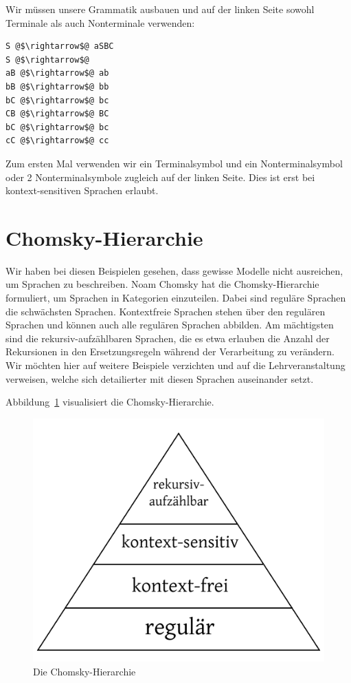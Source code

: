 Wir müssen unsere Grammatik ausbauen und auf der linken Seite sowohl Terminale als auch Nonterminale verwenden:
\begin{lstlisting}
S @$\rightarrow$@ aSBC
S @$\rightarrow$@
aB @$\rightarrow$@ ab
bB @$\rightarrow$@ bb
bC @$\rightarrow$@ bc
CB @$\rightarrow$@ BC
bC @$\rightarrow$@ bc
cC @$\rightarrow$@ cc
\end{lstlisting}

Zum ersten Mal verwenden wir ein Terminalsymbol und ein Nonterminalsymbol oder 2 Nonterminalsymbole zugleich auf der linken Seite. Dies ist erst bei kontext-sensitiven Sprachen erlaubt.

\section{Chomsky-Hierarchie}
%
Wir haben bei diesen Beispielen gesehen, dass gewisse Modelle nicht ausreichen, um Sprachen zu beschreiben. Noam Chomsky hat die Chomsky-Hierarchie formuliert, um Sprachen in Kategorien einzuteilen. Dabei sind reguläre Sprachen die schwächsten Sprachen. Kontextfreie Sprachen stehen über den regulären Sprachen und können auch alle regulären Sprachen abbilden. Am mächtigsten sind die rekursiv-aufzählbaren Sprachen, die es etwa erlauben die Anzahl der Rekursionen in den Ersetzungsregeln während der Verarbeitung zu verändern. Wir möchten hier auf weitere Beispiele verzichten und auf die Lehrveranstaltung \courseswp{} verweisen, welche sich detailierter mit diesen Sprachen auseinander setzt.

Abbildung~\ref{fig:chomsky_hierarchy} visualisiert die Chomsky-Hierarchie.
%
\begin{figure}[h]
 \begin{center}
  \includegraphics{img/chomsky_hierarchy.pdf}
  \caption{Die Chomsky-Hierarchie}
  \label{fig:chomsky_hierarchy}
 \end{center}
\end{figure}
